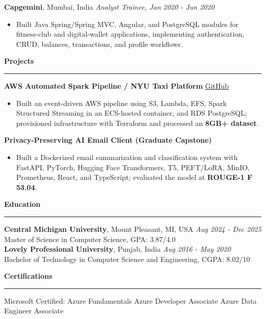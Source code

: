 \documentclass[11pt,letterpaper]{article}
\newcommand{\ressection}[1]{\Needspace{5\baselineskip}\vspace{8pt}\par\textbf{#1}\par\vspace{2pt}\hrule\vspace{5pt}}
\begin{document}
\textbf{Capgemini}, Mumbai, India \hfill \textit{Analyst Trainee, Jan 2020 - Jun 2020}
\begin{itemize}
  \item Built Java Spring/Spring MVC, Angular, and PostgreSQL modules for fitness-club and digital-wallet applications, implementing authentication, CRUD, balances, transactions, and profile workflows.
\end{itemize}

\ressection{Projects}
\textbf{AWS Automated Spark Pipeline / NYU Taxi Platform} \hfill \href{https://github.com/preferablehuman/AWS-automated-spark-pipeline}{GitHub}
\begin{itemize}
  \item Built an event-driven AWS pipeline using S3, Lambda, EFS, Spark Structured Streaming in an ECS-hosted container, and RDS PostgreSQL; provisioned infrastructure with Terraform and processed an \textbf{8GB+ dataset}.
\end{itemize}
\vspace{3pt}\par
\textbf{Privacy-Preserving AI Email Client (Graduate Capstone)}
\begin{itemize}
  \item Built a Dockerized email summarization and classification system with FastAPI, PyTorch, Hugging Face Transformers, T5, PEFT/LoRA, MinIO, Prometheus, React, and TypeScript; evaluated the model at \textbf{ROUGE-1 F 53.04}.
\end{itemize}

\ressection{Education}
\textbf{Central Michigan University}, Mount Pleasant, MI, USA \hfill \textit{Aug 2024 - Dec 2025}\\
Master of Science in Computer Science, GPA: 3.87/4.0\\[3pt]
\textbf{Lovely Professional University}, Punjab, India \hfill \textit{Aug 2016 - May 2020}\\
Bachelor of Technology in Computer Science and Engineering, CGPA: 8.02/10

\ressection{Certifications}
Microsoft Certified: Azure Fundamentals \textbar{} Azure Developer Associate \textbar{} Azure Data Engineer Associate
\end{document}

